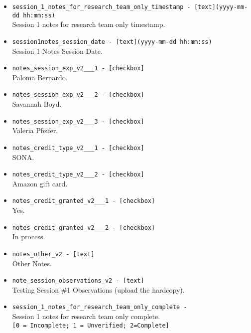 \begin{description}
\begin{addmargin}[0em]{0em}
\begin{addmargin}[1em]{0em}
\begin{itemize}
            \item \verb|session_1_notes_for_research_team_only_timestamp - [text](yyyy-mm-dd hh:mm:ss)|\\Session 1 notes for research team only timestamp.
            \item \verb|session1notes_session_date - [text](yyyy-mm-dd hh:mm:ss)|\\Session 1 Notes Session Date.
            \item \verb|notes_session_exp_v2___1 - [checkbox]|\\Paloma Bernardo.
            \item \verb|notes_session_exp_v2___2 - [checkbox]|\\Savannah Boyd.
            \item \verb|notes_session_exp_v2___3 - [checkbox]|\\Valeria Pfeifer.
            \item \verb|notes_credit_type_v2___1 - [checkbox]|\\SONA.
            \item \verb|notes_credit_type_v2___2 - [checkbox]|\\Amazon gift card.
            \item \verb|notes_credit_granted_v2___1 - [checkbox]|\\Yes.
            \item \verb|notes_credit_granted_v2___2 - [checkbox]|\\In process.
            \item \verb|notes_other_v2 - [text]|\\Other Notes.
            \item \verb|note_session_observations_v2 - [text]|\\Testing Session \#1 Observations (upload the hardcopy).
            \item \verb|session_1_notes_for_research_team_only_complete - |\\Session 1 notes for research team only complete.\\\verb|[0 = Incomplete; 1 = Unverified; 2=Complete]|
        \end{itemize}
    \end{addmargin} %



\end{addmargin}
\end{description}
